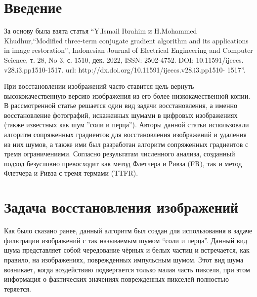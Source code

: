 



\makeatletter
\newcommand{\stackover}{\genfrac{.}{.}\z@{}}
\makeatother




\tableofcontents
\newpage

\section{Введение}

За основу была взята статья ``Y.Ismail Ibrahim и H.Mohammed Khudhur,“Modified
three-term conjugate gradient algorithm and its applications in image
restoration”, Indonesian Journal of Electrical Engineering and Computer Science,
т. 28, No 3, с. 1510, дек. 2022, ISSN: 2502-4752. DOI: 10.11591/ijeecs.
v28.i3.pp1510-1517. url: http://dx.doi.org/10.11591/ijeecs.v28.i3.pp1510- 1517''.

При восстановлении изображений часто ставится цель вернуть высококачественную
версию изображения из его более низкокачественной копии. В рассмотренной статье
решается один вид задачи восстановления, а именно восстановление фотографий,
искаженных шумами в цифровых изображениях (также известных как шум ''соли и
перца''). Авторы данной статьи использовали алгоритм сопряженных градиентов для
восстановления изображений и удаления из них шумов, а также ими был разработан
алгоритм сопряженных градиентов с тремя ограничениями. Согласно результатам
численного анализа, созданный подход безусловно превосходит как метод
Флетчера и Ривза (FR), так и метод Флетчера и Ривза с тремя термами (TTFR).

\newpage
\section{Задача восстановления изображений}

Как было сказано ранее, данный алгоритм был создан для использования в задаче
фильтрации изображений с так называемым шумом ``соли и перца''. Данный вид шума
представляет собой чередование чёрных и белых частиц и встречается, как правило,
на изображениях, поврежденных импульсным шумом. Этот вид шума возникает, когда
воздействию подвергается только малая часть пикселя, при этом информация о
фактических значениях поврежденных пикселей полностью теряется.

